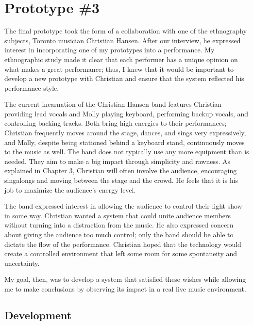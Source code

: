 

\section{Prototype \#3}

The final prototype took the form of a collaboration with one of the ethnography subjects, Toronto musician Christian Hansen. After our interview, he expressed interest in incorporating one of my prototypes into a performance. My ethnographic study made it clear that each performer has a unique opinion on what makes a great performance; thus, I knew that it would be important to develop a new prototype with Christian and ensure that the system reflected his performance style.

The current incarnation of the Christian Hansen band features Christian providing lead vocals and Molly playing keyboard, performing backup vocals, and controlling backing tracks. Both bring high energies to their performances; Christian frequently moves around the stage, dances, and sings very expressively, and Molly, despite being stationed behind a keyboard stand, continuously moves to the music as well. The band does not typically use any more equipment than is needed. They aim to make a big impact through simplicity and rawness. As explained in Chapter 3, Christian will often involve the audience, encouraging singalongs and moving between the stage and the crowd. He feels that it is his job to maximize the audience's energy level.

The band expressed interest in allowing the audience to control their light show in some way. Christian wanted a system that could unite audience members without turning into a distraction from the music. He also expressed concern about giving the audience too much control; only the band should be able to dictate the flow of the performance. Christian hoped that the technology would create a controlled environment that left some room for some spontaneity and uncertainty.

My goal, then, was to develop a system that satisfied these wishes while allowing me to make conclusions by observing its impact in a real live music environment.


\subsection{Development}

